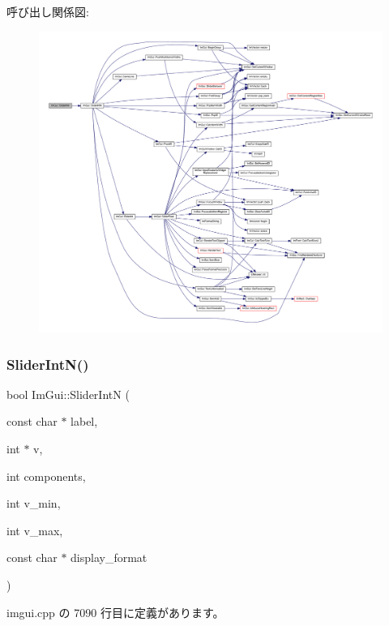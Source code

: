 呼び出し関係図\+:\nopagebreak
\begin{figure}[H]
\begin{center}
\leavevmode
\includegraphics[width=350pt]{namespace_im_gui_a88c24aa0e5af4cbb14559b5789886810_cgraph}
\end{center}
\end{figure}
\mbox{\label{namespace_im_gui_a13fe35db80c7d1002c98fd5e8ea90239}} 
\subsubsection{\texorpdfstring{Slider\+Int\+N()}{SliderIntN()}}
{\footnotesize\ttfamily bool Im\+Gui\+::\+Slider\+IntN (\begin{DoxyParamCaption}\item[{const char $\ast$}]{label,  }\item[{int $\ast$}]{v,  }\item[{int}]{components,  }\item[{int}]{v\+\_\+min,  }\item[{int}]{v\+\_\+max,  }\item[{const char $\ast$}]{display\+\_\+format }\end{DoxyParamCaption})}



 imgui.\+cpp の 7090 行目に定義があります。

